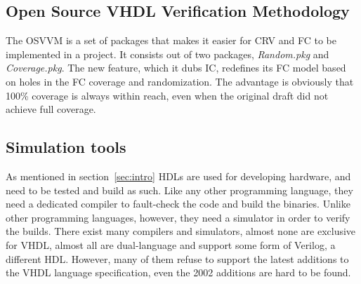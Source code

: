 \documentclass[11pt,british]{article}
\begin{document}

\subsection{Open Source VHDL Verification Methodology}
The \gls{OSVVM} is a set of packages that makes it easier for \gls{CRV} and \gls{FC} to be implemented in a project. It consists out of two packages, \emph{Random.pkg} and \emph{Coverage.pkg}. The new feature, which it dubs \gls{IC}, redefines its FC model based on holes in the FC coverage and randomization. The advantage is obviously that 100\% coverage is always within reach, even when the original draft did not achieve full coverage.\cite{ICoverage}


\subsection{Simulation tools}
As mentioned in section~\ref{sec:intro} \gls{HDL}s are used for developing hardware, and need to be tested and build as such. Like any other programming language, they need a dedicated compiler to fault-check the code and build the binaries. Unlike other programming languages, however, they need a simulator in order to verify the builds. There exist many compilers and simulators, almost none are exclusive for \gls{VHDL}, almost all are dual-language and support some form of Verilog, a different HDL. However, many of them refuse to support the latest additions to the VHDL language specification, even the 2002 additions are hard to be found.

\label{subsec:simtool}
\end{document}
